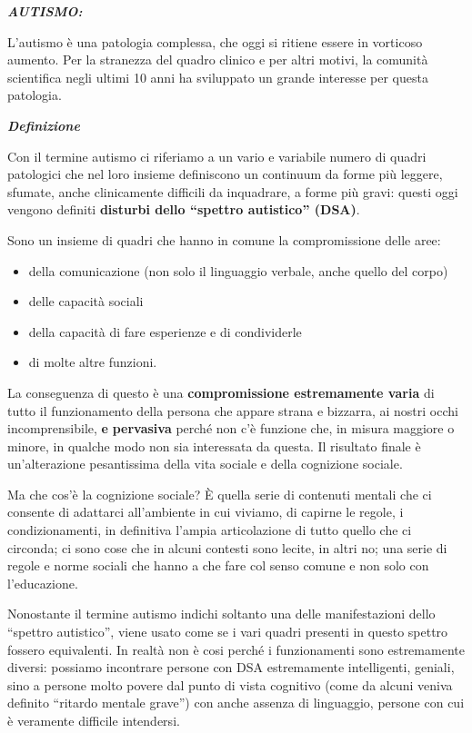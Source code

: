\documentclass[]{article}
\date{}
\begin{document}
\textbf{\emph{AUTISMO:}}

L'autismo è una patologia complessa, che oggi si ritiene essere in
vorticoso aumento. Per la stranezza del quadro clinico e per altri
motivi, la comunità scientifica negli ultimi 10 anni ha sviluppato un
grande interesse per questa patologia.

\emph{\textbf{Definizione}}

Con il termine autismo ci riferiamo a un vario e variabile numero di
quadri patologici che nel loro insieme definiscono un continuum da forme
più leggere, sfumate, anche clinicamente difficili da inquadrare, a
forme più gravi: questi oggi vengono definiti \textbf{disturbi dello
``spettro autistico'' (DSA)}.

Sono un insieme di quadri che hanno in comune la compromissione delle
aree:

\begin{itemize}
\item
  della comunicazione (non solo il linguaggio verbale, anche quello del
  corpo)
\item
  delle capacità sociali
\item
  della capacità di fare esperienze e di condividerle
\item
  di molte altre funzioni.
\end{itemize}

La conseguenza di questo è una \textbf{compromissione estremamente
varia} di tutto il funzionamento della persona che appare strana e
bizzarra, ai nostri occhi incomprensibile, \textbf{e} \textbf{pervasiva}
perché non c'è funzione che, in misura maggiore o minore, in qualche
modo non sia interessata da questa. Il risultato finale è un'alterazione
pesantissima della vita sociale e della cognizione sociale.

Ma che cos'è la cognizione sociale? È quella serie di contenuti mentali
che ci consente di adattarci all'ambiente in cui viviamo, di capirne le
regole, i condizionamenti, in definitiva l'ampia articolazione di tutto
quello che ci circonda; ci sono cose che in alcuni contesti sono lecite,
in altri no; una serie di regole e norme sociali che hanno a che fare
col senso comune e non solo con l'educazione.

Nonostante il termine autismo indichi soltanto una delle manifestazioni
dello ``spettro autistico'', viene usato come se i vari quadri presenti
in questo spettro fossero equivalenti. In realtà non è cosi perché i
funzionamenti sono estremamente diversi: possiamo incontrare persone con
DSA estremamente intelligenti, geniali, sino a persone molto povere dal
punto di vista cognitivo (come da alcuni veniva definito ``ritardo
mentale grave'') con anche assenza di linguaggio, persone con cui è
veramente difficile intendersi.
\end{document}
